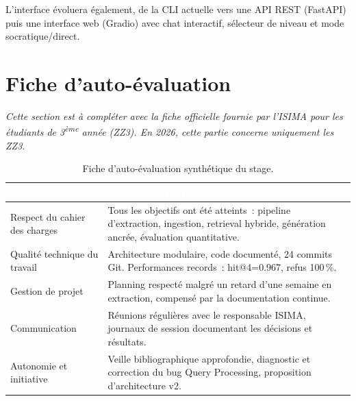 \documentclass[11pt,a4paper]{article}
\begin{document}
L'interface évoluera également, de la CLI actuelle vers une API REST (FastAPI) puis une interface web (Gradio) avec chat interactif, sélecteur de niveau et mode socratique/direct.

\section{Fiche d'auto-évaluation}
\label{app:auto-evaluation}

{\small\textit{Cette section est à compléter avec la fiche officielle fournie par l'ISIMA pour les étudiants de 3\textsuperscript{ème} année (ZZ3). En 2026, cette partie concerne uniquement les ZZ3.}}

\vspace{1cm}

\begin{table}[H]
\centering
\begin{tabularx}{\linewidth}{L{5cm} L{7cm}}
\toprule
{}
\textcolor{white}{\textbf{Critère}} & \textcolor{white}{\textbf{Auto-évaluation}} \\
\midrule
Respect du cahier des charges & Tous les objectifs ont été atteints~: pipeline d'extraction, ingestion, retrieval hybride, génération ancrée, évaluation quantitative. \\
\midrule
Qualité technique du travail  & Architecture modulaire, code documenté, 24 commits Git. Performances records~: hit@4=0.967, refus 100\,\%. \\
\midrule
Gestion de projet             & Planning respecté malgré un retard d'une semaine en extraction, compensé par la documentation continue. \\
\midrule
Communication                 & Réunions régulières avec le responsable ISIMA, journaux de session documentant les décisions et résultats. \\
\midrule
Autonomie et initiative       & Veille bibliographique approfondie, diagnostic et correction du bug Query Processing, proposition d'architecture v2. \\
\bottomrule
\end{tabularx}
\caption{Fiche d'auto-évaluation synthétique du stage.}
\label{tab:auto-eval}
\end{table}
\end{document}
